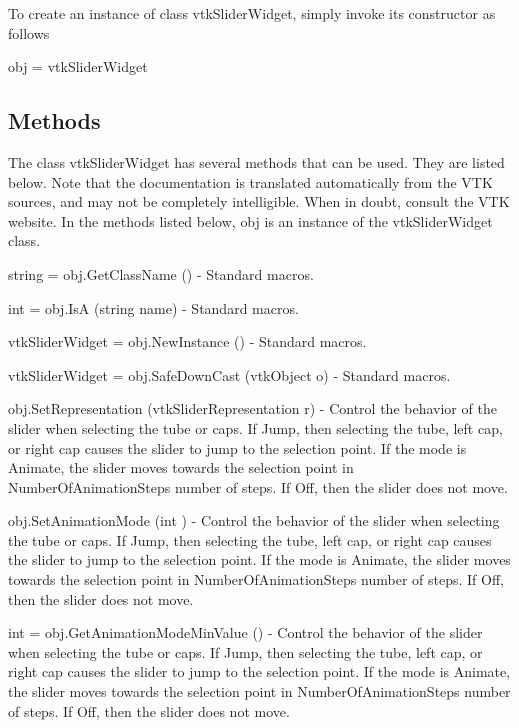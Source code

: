 To create an instance of class vtk\-Slider\-Widget, simply invoke its constructor as follows \begin{DoxyVerb}  obj = vtkSliderWidget
\end{DoxyVerb}
 \hypertarget{vtkwidgets_vtkxyplotwidget_Methods}{}\subsection{Methods}\label{vtkwidgets_vtkxyplotwidget_Methods}
The class vtk\-Slider\-Widget has several methods that can be used. They are listed below. Note that the documentation is translated automatically from the V\-T\-K sources, and may not be completely intelligible. When in doubt, consult the V\-T\-K website. In the methods listed below, {\ttfamily obj} is an instance of the vtk\-Slider\-Widget class. 
\begin{DoxyItemize}
\item {\ttfamily string = obj.\-Get\-Class\-Name ()} -\/ Standard macros.  
\item {\ttfamily int = obj.\-Is\-A (string name)} -\/ Standard macros.  
\item {\ttfamily vtk\-Slider\-Widget = obj.\-New\-Instance ()} -\/ Standard macros.  
\item {\ttfamily vtk\-Slider\-Widget = obj.\-Safe\-Down\-Cast (vtk\-Object o)} -\/ Standard macros.  
\item {\ttfamily obj.\-Set\-Representation (vtk\-Slider\-Representation r)} -\/ Control the behavior of the slider when selecting the tube or caps. If Jump, then selecting the tube, left cap, or right cap causes the slider to jump to the selection point. If the mode is Animate, the slider moves towards the selection point in Number\-Of\-Animation\-Steps number of steps. If Off, then the slider does not move.  
\item {\ttfamily obj.\-Set\-Animation\-Mode (int )} -\/ Control the behavior of the slider when selecting the tube or caps. If Jump, then selecting the tube, left cap, or right cap causes the slider to jump to the selection point. If the mode is Animate, the slider moves towards the selection point in Number\-Of\-Animation\-Steps number of steps. If Off, then the slider does not move.  
\item {\ttfamily int = obj.\-Get\-Animation\-Mode\-Min\-Value ()} -\/ Control the behavior of the slider when selecting the tube or caps. If Jump, then selecting the tube, left cap, or right cap causes the slider to jump to the selection point. If the mode is Animate, the slider moves towards the selection point in Number\-Of\-Animation\-Steps number of steps. If Off, then the slider does not move.  

\end{DoxyItemize}
